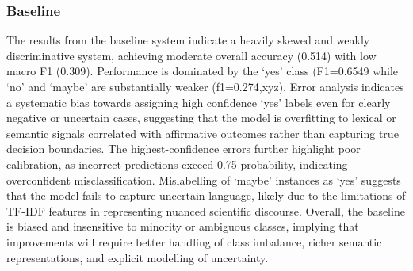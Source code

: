 \documentclass[11pt]{article}
\begin{document}
\subsubsection{Baseline}
The results from the baseline system indicate a heavily skewed and weakly discriminative system, achieving moderate overall accuracy (0.514) with low macro F1 (0.309). Performance is dominated by the ‘yes’ class (F1=0.6549 while ‘no’ and ‘maybe’ are substantially weaker (f1=0.274,xyz). Error analysis indicates a systematic bias towards assigning high confidence ‘yes’ labels even for clearly negative or uncertain cases, suggesting that the model is overfitting to lexical or semantic signals correlated with affirmative outcomes rather than capturing true decision boundaries. The highest-confidence errors further highlight poor calibration, as incorrect predictions exceed 0.75 probability, indicating overconfident misclassification. Mislabelling of ‘maybe’ instances as ‘yes’ suggests that the model fails to capture uncertain language, likely due to the limitations of TF-IDF features in representing nuanced scientific discourse. Overall, the baseline is biased and insensitive to minority or ambiguous classes, implying that improvements will require better handling of class imbalance, richer semantic representations, and explicit modelling of uncertainty. \par
\end{document}
